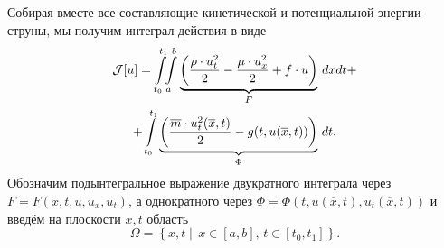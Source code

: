 Собирая вместе все составляющие кинетической и потенциальной энергии струны, мы получим интеграл действия в виде
\begin{multline*}
	 \mathcal{J}[u]=\int\limits_{t_0}^{t_1}\!\!\int\limits_a^b\underbrace{\left(\frac{\rho\cdot u^2_t}{2}-\frac{\mu\cdot u^2_x}{2}+f\cdot u\right)}_{F}\,dxdt+\\+\int\limits_{t_0}^{t_1}\underbrace{\left(\frac{\overline{m}\cdot u^2_t(\overline{x},t)}{2}-g(t,u(\overline{x},t))\right)}_{\Phi}\,dt.
\end{multline*}
Обозначим подынтегральное выражение двукратного интеграла через $F=F(x,t,u,u_x,u_t)$, а однократного через $\Phi=\Phi(t,u(\overline{x},t),u_t(\overline{x},t))$ и введём на плоскости $x,t$ область 
\begin{equation*}
	\Omega=\left\{x,t\middle|\, x\in[a,b],\, t\in[t_0,t_1]\right\}.
\end{equation*}
